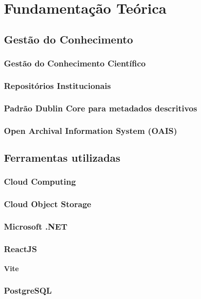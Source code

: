 
\chapter{Fundamentação Teórica}\label{chap:background}

\section{Gestão do Conhecimento}\label{sec:business}
\subsection{Gestão do Conhecimento Científico}
\subsection{Repositórios Institucionais}
\subsection{Padrão Dublin Core para metadados descritivos}
\subsection{Open Archival Information System (OAIS)}

\section{Ferramentas utilizadas}\label{sec:fundamental}
\subsection{Cloud Computing}
\subsection{Cloud Object Storage}
\subsection{Microsoft .NET}
\subsection{ReactJS}
\subsubsection{Vite}

\subsection{PostgreSQL}
